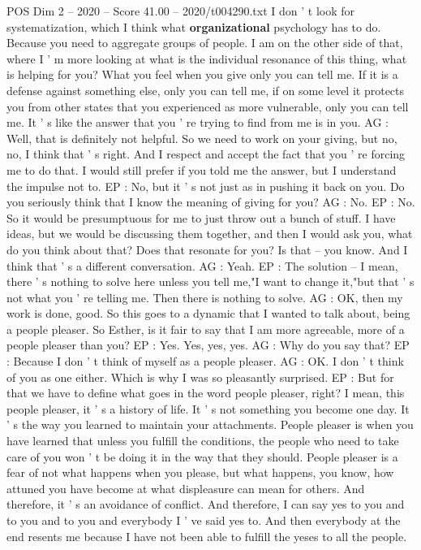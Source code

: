 \begin{textsample}{POS Dim 2 – 2020 – Score 41.00 – 2020/t004290.txt}
I don ' t look for systematization, which I think what \textbf{organizational} psychology has to do.
Because you need to aggregate groups of people.
I am on the other side of that, where I ' m more looking at what is the individual resonance of this thing, what is helping for you?
What you feel when you give only you can tell me.
If it is a defense against something else, only you can tell me, if on some level it protects you from other states that you experienced as more vulnerable, only you can tell me.
It ' s like the answer that you ' re trying to find from me is in you.
AG : Well, that is definitely not helpful.
So we need to work on your giving, but no, no, I think that ' s right.
And I respect and accept the fact that you ' re forcing me to do that.
I would still prefer if you told me the answer, but I understand the impulse not to.
EP : No, but it ' s not just as in pushing it back on you.
Do you seriously think that I know the meaning of giving for you?
AG : No.
EP : No.
So it would be presumptuous for me to just throw out a bunch of stuff.
I have ideas, but we would be discussing them together, and then I would ask you, what do you think about that?
Does that resonate for you?
Is that -- you know.
And I think that ' s a different conversation.
AG : Yeah.
EP : The solution -- I mean, there ' s nothing to solve here unless you tell me,"I want to change it,"but that ' s not what you ' re telling me.
Then there is nothing to solve.
AG : OK, then my work is done, good.
So this goes to a dynamic that I wanted to talk about, being a people pleaser.
So Esther, is it fair to say that I am more agreeable, more of a people pleaser than you?
EP : Yes.
Yes, yes, yes.
AG : Why do you say that?
EP : Because I don ' t think of myself as a people pleaser.
AG : OK.
I don ' t think of you as one either.
Which is why I was so pleasantly surprised.
EP : But for that we have to define what goes in the word people pleaser, right?
I mean, this people pleaser, it ' s a history of life.
It ' s not something you become one day.
It ' s the way you learned to maintain your attachments.
People pleaser is when you have learned that unless you fulfill the conditions, the people who need to take care of you won ' t be doing it in the way that they should.
People pleaser is a fear of not what happens when you please, but what happens, you know, how attuned you have become at what displeasure can mean for others.
And therefore, it ' s an avoidance of conflict.
And therefore, I can say yes to you and to you and to you and everybody I ' ve said yes to.
And then everybody at the end resents me because I have not been able to fulfill the yeses to all the people.

\end{textsample}
